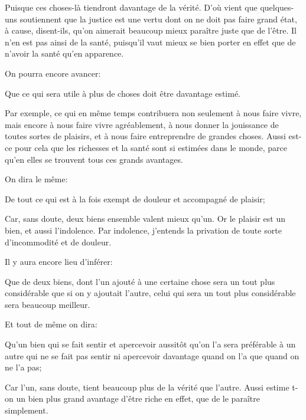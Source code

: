 Puisque ces choses-là tiendront davantage de la vérité. D'où vient que quelques-uns soutiennent que la justice est une vertu
dont on ne doit pas faire grand état, à cause, disent-ils, qu'on aimerait beaucoup mieux paraître juste que de l'être. Il
n'en est pas ainsi de la santé, puisqu'il vaut mieux se bien porter en effet que de n'avoir la santé qu'en apparence.

\bigbreak

On pourra encore avancer:

\begin{lieu}
  Que ce qui sera utile à plus de choses doit être davantage estimé.
\end{lieu}

Par exemple, ce qui en même temps contribuera non seulement à nous faire vivre, mais encore à nous faire vivre agréablement,
à nous donner la jouissance de toutes sortes de plaisirs, et à nous faire entreprendre de grandes choses. Aussi est-ce pour
cela que les richesses et la santé sont si estimées dans le monde, parce qu'en elles se trouvent tous ces grands avantages.

\bigbreak

On dira le même:

\begin{lieu}
  De tout ce qui est à la fois exempt de douleur et accompagné de plaisir;
\end{lieu}

Car, sans doute, deux biens ensemble valent mieux qu'un. Or le plaisir est un bien, et aussi l'indolence. Par indolence,
j'entends la privation de toute sorte d'incommodité et de douleur.

\bigbreak

Il y aura encore lieu d'inférer:

\begin{lieu}
  Que de deux biens, dont l'un ajouté à une certaine chose sera un tout plus considérable que si on y ajoutait l'autre,
  celui qui sera un tout plus considérable sera beaucoup meilleur.
\end{lieu}

Et tout de même on dira:

\begin{lieu}
  Qu'un bien qui se fait sentir et apercevoir aussitôt qu'on l'a sera préférable à un autre qui ne se fait pas sentir ni
  apercevoir davantage quand on l'a que quand on ne l'a pas;
\end{lieu}

Car l'un, sans doute, tient beaucoup plus de la vérité que l'autre. Aussi estime t-on un bien plus grand avantage d'être
riche en effet, que de le paraître simplement.

